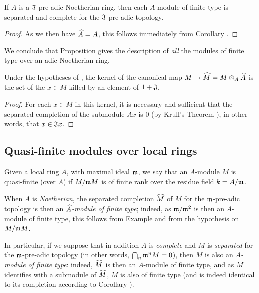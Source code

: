 \begin{cor}[7.3.6]
\label{0.7.3.6}
If $A$ is a $\mathfrak{J}$-pre-adic Noetherian ring, then each $A$-module of finite type
is separated and complete for the $\mathfrak{J}$-pre-adic topology.
\end{cor}

\begin{proof}
\label{proof-0.7.3.6}
As we then have $\widehat{A}=A$, this follows immediately from
Corollary .
\end{proof}

We conclude that Proposition  gives the description of
\emph{all} the modules of finite type over an adic Noetherian ring.

\begin{cor}[7.3.7]
\label{0.7.3.7}
Under the hypotheses of , the kernel of the canonical map
$M\to\wh{M}=M\otimes_A\wh{A}$ is the set of the $x\in M$ killed by an element of
$1+\mathfrak{J}$.
\end{cor}

\begin{proof}
\label{proof-0.7.3.7}
For each $x\in M$ in this kernel, it is necessary and sufficient that the separated
completion of the submodule $Ax$ is $0$
(by Krull's Theorem ), in other words, that
$x\in\mathfrak{J}x$.
\end{proof}

\subsection{Quasi-finite modules over local rings}
\label{subsection:quasi-finite-modules-over-local-rings}

\begin{defn}[7.4.1]
\label{0.7.4.1}
Given a local ring $A$, with maximal ideal $\mathfrak{m}$, we say that an $A$-module $M$
is quasi-finite (over $A$) if $M/\mathfrak{m}M$ is of finite rank over the residue field
$k=A/\mathfrak{m}$.
\end{defn}

When $A$ is \emph{Noetherian}, the separated completion $\widehat{M}$ of $M$ for the
$\mathfrak{m}$-pre-adic topology is then an \emph{$\widehat{A}$-module of finite type};
indeed, as $\mathfrak{m}/\mathfrak{m}^2$ is then an $A$-module of finite type, this follows
from Example  and from the hypothesis on $M/\mathfrak{m}M$.

In particular, if we suppose that in addition $A$ is \emph{complete} and $M$ is
\emph{separated} for the $\mathfrak{m}$-pre-adic topology (in other words,
$\bigcap_n\mathfrak{m}^n M=0$), then $M$ is also an \emph{$A$-module of finite type}: indeed,
$\widehat{M}$ is then an $A$-module of finite type, and as $M$ identifies with a submodule of
$\widehat{M}$, $M$ is also of finite type (and is indeed identical to its completion
according to Corollary ).

